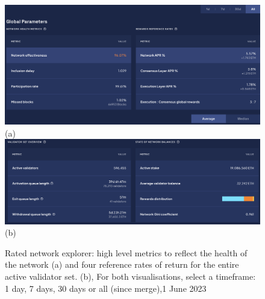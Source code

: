 \documentclass[UTF8]{article}
\begin{document}
\begin{figure}[htbp]
\begin{center}
\includegraphics[width=\linewidth]{images/ratednw1}\\
(a)
\includegraphics[width=\linewidth]{images/ratednw2}\\
(b)
\caption{Rated network explorer: high level metrics to reflect the health of the network  (a) and four reference rates of return for the entire active validator set. (b), For both visualisations, select a timeframe: 1 day, 7 days, 30 days or all (since merge),1 June 2023}
\label{fig:ratednw1}
\end{center}
\end{figure}
\end{document}
